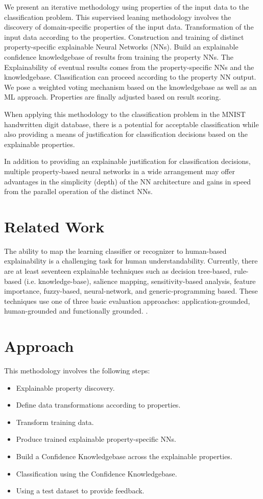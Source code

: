 \documentclass[conference]{IEEEtran}
\begin{document}
We present an iterative methodology using properties of the input data to the classification problem.  This supervised leaning methodology involves the discovery of domain-specific properties of the input data.  Transformation of the input data according to the properties.  Construction and training of distinct property-specific explainable Neural Networks (NNs).  Build an explainable confidence knowledgebase of results from training the property NNs.  The Explainability of eventual results comes from the property-specific NNs and the knowledgebase.  Classification can proceed according to the property NN output.  We pose a weighted voting mechanism based on the knowledgebase as well as an ML approach.   Properties are finally adjusted based on result scoring.

When applying this methodology to the classification problem in the MNIST handwritten digit database, there is a potential for acceptable classification while also providing a means of justification for classification decisions based on the explainable properties.

In addition to providing an explainable justification for classification decisions, multiple property-based neural networks in a wide arrangement may offer advantages in the simplicity (depth) of the NN architecture and gains in speed from the parallel operation of the distinct NNs.

\section{Related Work}

The ability to map the learning classifier or recognizer to human-based explainability is a challenging task for human understandability.  Currently, there are at least seventeen explainable techniques such as
decision tree-based, rule-based (i.e. knowledge-base), salience mapping,
sensitivity-based analysis, feature importance, fuzzy-based, neural-network, and generic-programming based.  These techniques use one of three basic evaluation approaches: application-grounded, human-grounded and functionally grounded. \cite{Hagras18} \cite{BlackBox18} \cite{Survey18} \cite{Fuzzy19} \cite{GP18}.

\section{Approach}

This methodology involves the following steps:
\begin{itemize}
\item Explainable property discovery.
\item Define data transformations according to properties.
\item Transform training data.
\item Produce trained explainable property-specific NNs.
\item Build a Confidence Knowledgebase across the explainable properties.
\item Classification using the Confidence Knowledgebase.
\item Using a test dataset to provide feedback.
\end{itemize}
\end{document}
